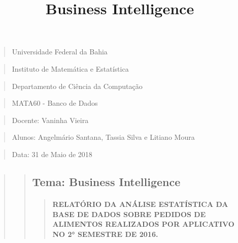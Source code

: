 \documentclass[11pt]{article}
\title{Business Intelligence}
\begin{document}
    
    
    \maketitle
    
    

    
    \begin{quote}
Universidade Federal da Bahia
\end{quote}

\begin{quote}
Instituto de Matemática e Estatística
\end{quote}

\begin{quote}
Departamento de Ciência da Computação
\end{quote}

\begin{quote}
MATA60 - Banco de Dados
\end{quote}

\begin{quote}
Docente: Vaninha Vieira
\end{quote}

\begin{quote}
Alunos: Angelmário Santana, Tassia Silva e Litiano Moura
\end{quote}

\begin{quote}
Data: 31 de Maio de 2018
\end{quote}

\begin{quote}
\begin{quote}
\subsection{Tema: Business
Intelligence}\label{tema-business-intelligence}

\begin{quote}
\mbox{}%
\paragraph{RELATÓRIO DA ANÁLISE ESTATÍSTICA DA BASE DE DADOS SOBRE
PEDIDOS DE ALIMENTOS REALIZADOS POR APLICATIVO NO 2° SEMESTRE DE
2016.}\label{relatuxf3rio-da-anuxe1lise-estatuxedstica-da-base-de-dados-sobre-pedidos-de-alimentos-realizados-por-aplicativo-no-2-semestre-de-2016.}
\end{quote}
\end{quote}
\end{quote}
\end{document}
